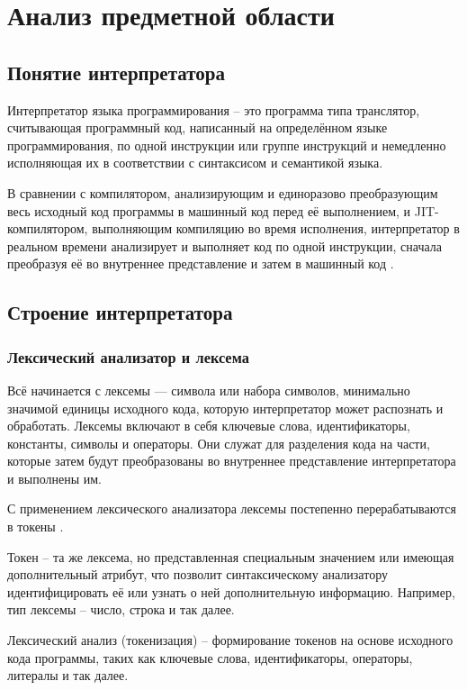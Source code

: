 \section{Анализ предметной области}

\subsection{Понятие интерпретатора}

Интерпретатор языка программирования -- это программа типа транслятор, считывающая программный код, написанный на определённом языке программирования, по одной инструкции или группе инструкций и немедленно исполняющая их в соответствии с синтаксисом и семантикой языка.

В сравнении с компилятором, анализирующим и единоразово преобразующим весь исходный код программы в машинный код перед её выполнением, и JIT-компилятором, выполняющим компиляцию во время исполнения, интерпретатор в реальном времени анализирует и выполняет код по одной инструкции, сначала преобразуя её во внутреннее представление и затем в машинный код \cite{e27}.



\subsection{Строение интерпретатора}

\subsubsection{Лексический анализатор и лексема}
Всё начинается с лексемы \cite{e21} — символа или набора символов, минимально значимой единицы исходного кода, которую интерпретатор может распознать и обработать. Лексемы включают в себя ключевые слова, идентификаторы, константы, символы и операторы. Они служат для разделения кода на части, которые затем будут преобразованы во внутреннее представление интерпретатора и выполнены им.

С применением лексического анализатора лексемы постепенно перерабатываются в токены \cite{e21}.

Токен -- та же лексема, но представленная специальным значением или имеющая дополнительный атрибут, что позволит синтаксическому анализатору идентифицировать её или узнать о ней дополнительную информацию. Например, тип лексемы -- число, строка и так далее.

Лексический анализ (токенизация) -- формирование токенов на основе исходного кода программы, таких как ключевые слова, идентификаторы, операторы, литералы и так далее. 

